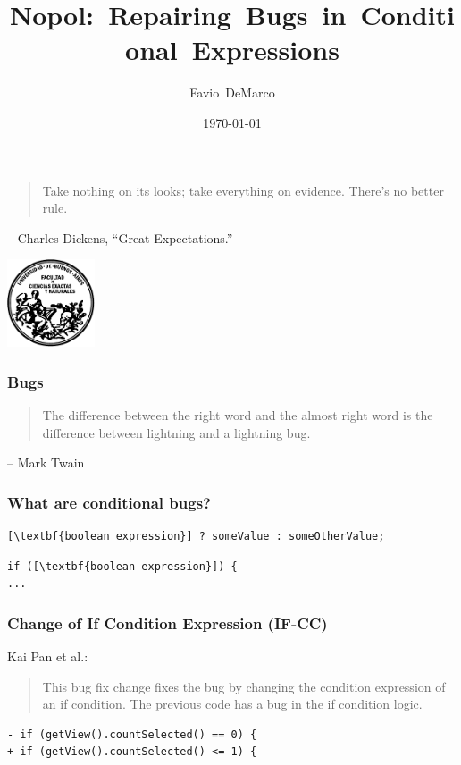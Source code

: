 \documentclass{beamer}
\title[{Nopol: Repairing Bugs in Conditional Expressions}]{Nopol:~Repairing~Bugs~in~Conditional~Expressions}
\author[Favio DeMarco]{Favio~DeMarco}
\institute[U.B.A. - INRIA]{Universidad de Buenos Aires - INRIA}
\date{\today}
\begin{document}
  \frame
  {
\begin{quote}
    Take nothing on its looks; take everything on evidence. There's no better rule.
\end{quote}    
– Charles Dickens, ``Great Expectations.''
  }

\frame
  {
  \begin{center}
  \includegraphics[width=7em]{logofcen}
  \end{center}
    \titlepage
  }

\begin{frame}  
\frametitle{Bugs}
\begin{quotation}
The difference between the right word and the almost right word is the difference between lightning and a lightning bug.
\end{quotation}
-- Mark Twain
\end{frame}
 
  
\begin{frame}[fragile]
\frametitle{What are conditional bugs?}
\begin{lstlisting}[escapeinside=\[\]]
[\textbf{boolean expression}] ? someValue : someOtherValue;
\end{lstlisting}

\begin{lstlisting}[escapeinside=\[\]]
if ([\textbf{boolean expression}]) {
...
\end{lstlisting}
\end{frame}

\begin{frame}[fragile]
\frametitle{Change of If Condition Expression (IF-CC)}
Kai Pan et al.:
\begin{quotation}
This bug fix change fixes the bug by changing the condition expression of an if
condition. The previous code has a bug in the if condition logic.
\end{quotation}

\vspace{1em}

\begin{lstlisting}
- if (getView().countSelected() == 0) {
+ if (getView().countSelected() <= 1) {
\end{lstlisting}
\end{frame}
  
\end{document}
